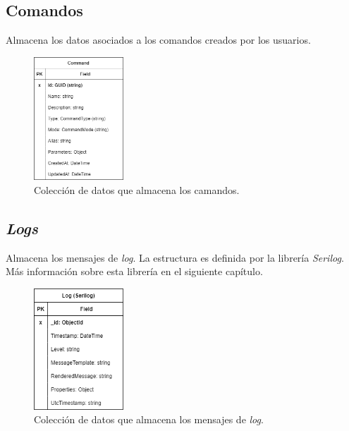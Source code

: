 \subsection{Comandos}

Almacena los datos asociados a los comandos creados por los usuarios.

\begin{figure}[H]
	\centering
	\includegraphics[width=0.3\textwidth]{img/database_architecture_command.png}
	\caption{Colección de datos que almacena los camandos.}
\end{figure}

\subsection{\textit{Logs}}

Almacena los mensajes de \textit{log}. La estructura es definida por la librería \textit{Serilog}. Más información sobre esta librería en el siguiente capítulo.

\begin{figure}[H]
	\centering
	\includegraphics[width=0.3\textwidth]{img/database_architecture_log.png}
	\caption{Colección de datos que almacena los mensajes de \textit{log}.}
\end{figure}
